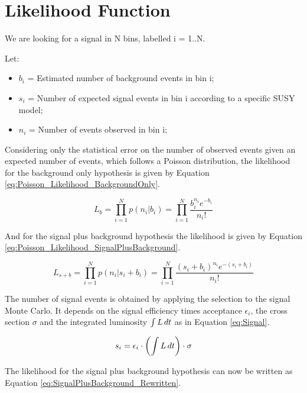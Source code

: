 \section{Likelihood Function}

We are looking for a signal in N bins, labelled i = 1..N.

Let: 
\begin{itemize}
\item $b_{i}$ = Estimated number of background events in bin i;
\item $s_{i}$ = Number of expected signal events in bin i according to a
specific SUSY model;
\item $n_{i}$ = Number of events observed in bin i;
\end{itemize}

Considering only the statistical error on the number of observed events given an
expected number of events, which follows a Poisson distribution, the likelihood 
for the background only hypothesis is given by Equation 
\ref{eq:Poisson_Likelihood_BackgroundOnly}.

\begin{equation}
L_{b} = \prod_{i=1}^{N} p(n_{i}|b_{i}) = \prod_{i=1}^{N} \frac{b_{i}^{n_{i}}e^{-b_{i}}}{n_{i}!} 
\label{eq:Poisson_Likelihood_BackgroundOnly}
\end{equation}

And for the signal plus background hypothesis the likelihood is given by Equation
\ref{eq:Poisson_Likelihood_SignalPlusBackground}.

\begin{equation}
L_{s+b} = \prod_{i=1}^{N} p(n_{i}|s_{i}+b_{i}) = \prod_{i=1}^{N}
\frac{\left(s_{i}+b_{i}\right)^{n_{i}}e^{-\left(s_{i}+b_{i}\right)}}{n_{i}!} 
\label{eq:Poisson_Likelihood_SignalPlusBackground}
\end{equation}

The number of signal events is obtained by applying the selection to the signal
Monte Carlo. It depends on the signal efficiency times acceptance $\epsilon_{i}$, 
the cross section $\sigma$ and the integrated luminosity $\int L\,dt$ 
as in Equation \ref{eq:Signal}.

\begin{equation}
s_{i} = \epsilon_{i} \cdot \left(\int L\,dt\right) \cdot \sigma 
\label{eq:Signal}
\end{equation} 

The likelihood for the signal plus background hypothesis can now be written as 
Equation \ref{eq:SignalPlusBackground_Rewritten}.


